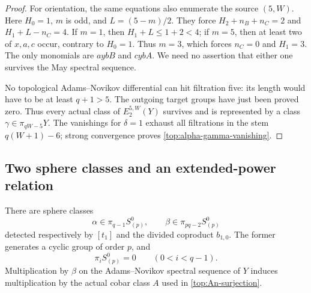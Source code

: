 \begin{proof}
For orientation, the same equations also enumerate the source
$(5,W)$. Here $H_0=1$, $m$ is odd, and $L=(5-m)/2$. They force
$H_2+n_B+n_C=2$ and $H_1+L-n_C=4$. If $m=1$, then
$H_1+L\leq1+2<4$; if $m=5$, then at least two of $x,a,c$
occur, contrary to $H_0=1$. Thus $m=3$, which forces
$n_C=0$ and $H_1=3$. The only monomials are $aybB$ and $cybA$. We need no assertion that either
one survives the May spectral sequence.

No topological Adams--Novikov differential can hit filtration
five: its length would have to be at least $q+1>5$.
The outgoing target groups have just been proved zero. Thus every
actual class of $E_2^{5,W}(Y)$ survives and is represented by a
class $\gamma\in\pi_{qW-5}Y$. The vanishings for $\delta=1$ exhaust
all filtrations in the stem $q(W+1)-6$; strong convergence proves
\eqref{top:alpha-gamma-vanishing}.
\end{proof}

\subsection{Two sphere classes and an extended-power relation}

\begin{lemma}
\label{top:sphere-classes}
There are sphere classes
\[
 \alpha\in\pi_{q-1}S^0_{(p)},\qquad
 \beta\in\pi_{pq-2}S^0_{(p)}
\]
detected respectively by $[t_1]$ and the divided coproduct
$b_{1,0}$. The former generates a cyclic group of order $p$, and
\[
 \pi_iS^0_{(p)}=0\qquad(0<i<q-1).
\]
Multiplication by $\beta$ on the Adams--Novikov spectral sequence
of $Y$ induces multiplication by the actual cobar class $A$ used
in \eqref{top:An-surjection}.
\end{lemma}

